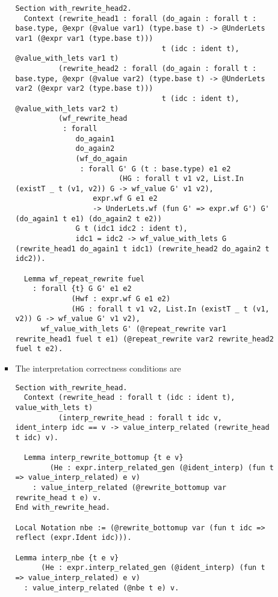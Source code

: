 \documentclass[
]{article}
\begin{document}
\begin{itemize}
\begin{itemize}
\begin{itemize}
\begin{verbatim}
Section with_rewrite_head2.
  Context (rewrite_head1 : forall (do_again : forall t : base.type, @expr (@value var1) (type.base t) -> @UnderLets var1 (@expr var1 (type.base t)))
                                  t (idc : ident t), @value_with_lets var1 t)
          (rewrite_head2 : forall (do_again : forall t : base.type, @expr (@value var2) (type.base t) -> @UnderLets var2 (@expr var2 (type.base t)))
                                  t (idc : ident t), @value_with_lets var2 t)
          (wf_rewrite_head
           : forall
              do_again1
              do_again2
              (wf_do_again
               : forall G' G (t : base.type) e1 e2
                        (HG : forall t v1 v2, List.In (existT _ t (v1, v2)) G -> wf_value G' v1 v2),
                  expr.wf G e1 e2
                  -> UnderLets.wf (fun G' => expr.wf G') G' (do_again1 t e1) (do_again2 t e2))
              G t (idc1 idc2 : ident t),
              idc1 = idc2 -> wf_value_with_lets G (rewrite_head1 do_again1 t idc1) (rewrite_head2 do_again2 t idc2)).

  Lemma wf_repeat_rewrite fuel
    : forall {t} G G' e1 e2
             (Hwf : expr.wf G e1 e2)
             (HG : forall t v1 v2, List.In (existT _ t (v1, v2)) G -> wf_value G' v1 v2),
      wf_value_with_lets G' (@repeat_rewrite var1 rewrite_head1 fuel t e1) (@repeat_rewrite var2 rewrite_head2 fuel t e2).
\end{verbatim}
    \item
      The interpretation correctness conditions are

\begin{verbatim}
Section with_rewrite_head.
  Context (rewrite_head : forall t (idc : ident t), value_with_lets t)
          (interp_rewrite_head : forall t idc v, ident_interp idc == v -> value_interp_related (rewrite_head t idc) v).

  Lemma interp_rewrite_bottomup {t e v}
        (He : expr.interp_related_gen (@ident_interp) (fun t => value_interp_related) e v)
    : value_interp_related (@rewrite_bottomup var rewrite_head t e) v.
End with_rewrite_head.

Local Notation nbe := (@rewrite_bottomup var (fun t idc => reflect (expr.Ident idc))).

Lemma interp_nbe {t e v}
      (He : expr.interp_related_gen (@ident_interp) (fun t => value_interp_related) e v)
  : value_interp_related (@nbe t e) v.


\end{verbatim}
\end{itemize}
\end{itemize}
\end{itemize}
\end{document}
